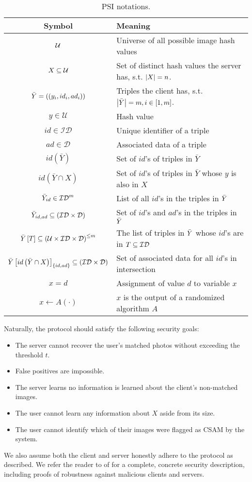 \begin{table}[t]
\centering
	\begin{tabular}{c l}
\toprule
	

		\textbf{Symbol} & \textbf{Meaning} \\
		\hline
		\hline
		$\mathcal{U}$	& 	Universe of all possible image hash values\\
		$X \subseteq \mathcal{U}$	&Set of distinct hash values the server has, s.t. $\left\lvert X\right\rvert = n$. \\
		$\bar{Y} = \left(\left(y_i, id_i, ad_i \right)\right)$	& Triples the client has, s.t. $\left\lvert\bar{Y}\right\rvert = m, i \in \left[1,m\right]$.	\\
		$y \in \mathcal{U}$	& 	Hash value\\
		$id \in \mathcal{ID}$	& 	Unique identifier of a triple\\
		$ad \in \mathcal{D}$	& 	Associated data of a triple\\
		$id(\bar{Y})$& Set of $id$'s of triples in $\bar{Y}$     \\

		$id(\bar{Y} \cap X)$& Set of $id$'s of triples in $\bar{Y}$ whose $y$ is also in $X$     \\
		$\bar{Y}_{id} \in \mathcal{ID}^{m}$	& List of all $id$'s in the triples in $\bar{Y}$    \\
		$\bar{Y}_{id, ad} \subseteq \left(\mathcal{ID} \times \mathcal{D}\right) $ & Set of $id$'s and $ad$'s in the triples in $\bar{Y}$  \\
		{$\bar{Y} \left[T\right]\subseteq \left(\mathcal{U} \times \mathcal{ID} \times \mathcal{D}\right)^{\leq m} $ }	& The list of triples in $\bar{Y}$ whose $id$'s are in $T \subseteq \mathcal{ID}$  \\
$\bar{Y}\left[id \left(\bar{Y} \cap X\right)\right]_{\left\{id,ad\right\}} \subseteq \left(\mathcal{ID} \times \mathcal{D}\right) $ & Set of associated data for all $id$'s in intersection\\
		$x = d$	&   Assignment of value $d$ to variable $x$  \\
		$x \gets A (\cdot)$	&   $x$ is the output of a randomized algorithm $A$\\
\bottomrule
	\end{tabular}
	\caption{PSI notations.}
	\label{tbl:notation}
\end{table} 

Naturally, the protocol should satisfy the following security goals:
  \begin{itemize}
    \item The server cannot recover the user's matched photos without exceeding the threshold $t$.
    \item False positives are impossible.
    \item The server learns no information is learned about the client's non-matched images.
    \item The user cannot learn any information about $X$ aside from its size.
    \item The user cannot identify which of their images were flagged as CSAM by the system.
\end{itemize}
We also assume both the client and server honestly adhere to the protocol as described. We refer the reader to  of \cite{bhowmick2021apple} for a complete, concrete security description, including proofs of robustness against malicious clients and servers.


